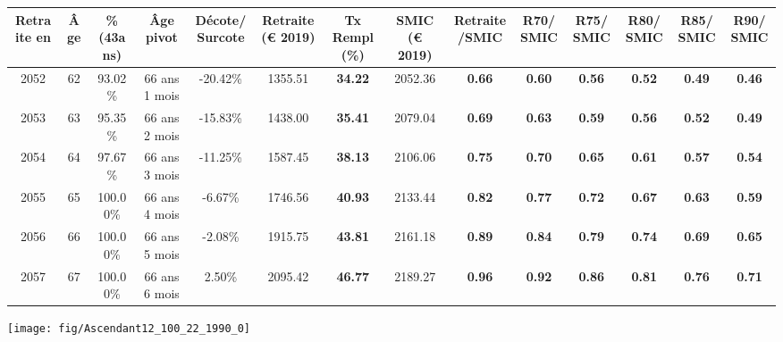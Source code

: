 \begin{adjustbox}{max width=\textwidth} 
\begin{tabular}[htb]{|c|c||c|c|c||c|c||c|c||c|c|c|c|c|} 
\hline 
 Retraite en &  Âge &  \%(43ans) &  Âge pivot &  Décote/Surcote &  Retraite (\euro{} 2019) &  Tx Rempl(\%) &  SMIC (\euro{} 2019) &  Retraite/SMIC &  R70/SMIC &  R75/SMIC &  R80/SMIC &  R85/SMIC &  R90/SMIC \\ 
\hline \hline 
 2052 &  62 &  93.02\% &  66 ans 1 mois &  -20.42\% &  1355.51 &  {\bf 34.22} &  2052.36 &  {\bf {\color{red} 0.66}} &  {\bf {\color{red} 0.60}} &  {\bf {\color{red} 0.56}} &  {\bf {\color{red} 0.52}} &  {\bf {\color{red} 0.49}} &  {\bf {\color{red} 0.46}} \\ 
\hline 
 2053 &  63 &  95.35\% &  66 ans 2 mois &  -15.83\% &  1438.00 &  {\bf 35.41} &  2079.04 &  {\bf {\color{red} 0.69}} &  {\bf {\color{red} 0.63}} &  {\bf {\color{red} 0.59}} &  {\bf {\color{red} 0.56}} &  {\bf {\color{red} 0.52}} &  {\bf {\color{red} 0.49}} \\ 
\hline 
 2054 &  64 &  97.67\% &  66 ans 3 mois &  -11.25\% &  1587.45 &  {\bf 38.13} &  2106.06 &  {\bf {\color{red} 0.75}} &  {\bf {\color{red} 0.70}} &  {\bf {\color{red} 0.65}} &  {\bf {\color{red} 0.61}} &  {\bf {\color{red} 0.57}} &  {\bf {\color{red} 0.54}} \\ 
\hline 
 2055 &  65 &  100.00\% &  66 ans 4 mois &  -6.67\% &  1746.56 &  {\bf 40.93} &  2133.44 &  {\bf {\color{red} 0.82}} &  {\bf {\color{red} 0.77}} &  {\bf {\color{red} 0.72}} &  {\bf {\color{red} 0.67}} &  {\bf {\color{red} 0.63}} &  {\bf {\color{red} 0.59}} \\ 
\hline 
 2056 &  66 &  100.00\% &  66 ans 5 mois &  -2.08\% &  1915.75 &  {\bf 43.81} &  2161.18 &  {\bf {\color{red} 0.89}} &  {\bf {\color{red} 0.84}} &  {\bf {\color{red} 0.79}} &  {\bf {\color{red} 0.74}} &  {\bf {\color{red} 0.69}} &  {\bf {\color{red} 0.65}} \\ 
\hline 
 2057 &  67 &  100.00\% &  66 ans 6 mois &  2.50\% &  2095.42 &  {\bf 46.77} &  2189.27 &  {\bf {\color{red} 0.96}} &  {\bf {\color{red} 0.92}} &  {\bf {\color{red} 0.86}} &  {\bf {\color{red} 0.81}} &  {\bf {\color{red} 0.76}} &  {\bf {\color{red} 0.71}} \\ 
\hline 
\hline 
\end{tabular} 
\end{adjustbox} 
 
 \vspace{0.1cm} 

 {\hspace{-2.2cm}\texttt{[image: fig/Ascendant12\_100\_22\_1990\_0]}} 

